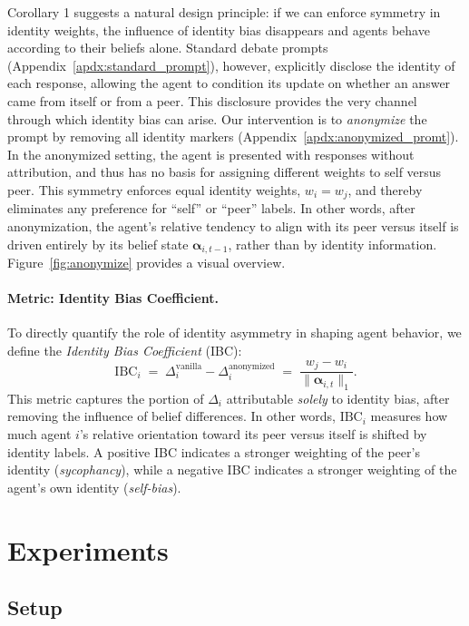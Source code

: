 \documentclass{article}
\begin{document}
Corollary 1 suggests a natural design principle: if we can enforce symmetry in identity weights, the influence of identity bias disappears and agents behave according to their beliefs alone. Standard debate prompts (Appendix~\ref{apdx:standard_prompt}), however, explicitly disclose the identity of each response, allowing the agent to condition its update on whether an answer came from itself or from a peer. 
This disclosure provides the very channel through which identity bias can arise. 
Our intervention is to \emph{anonymize} the prompt by removing all identity markers (Appendix~\ref{apdx:anonymized_promt}). 
In the anonymized setting, the agent is presented with responses without attribution, and thus has no basis for assigning different weights to self versus peer. 
This symmetry enforces equal identity weights, $w_i = w_j$, and thereby eliminates any  preference for ``self'' or ``peer'' labels.
In other words, after anonymization, the agent’s relative tendency to align with its peer versus itself is driven entirely by its belief state \(\boldsymbol\alpha_{i,t-1}\), rather than by identity information. 
Figure~\ref{fig:anonymize} provides a visual overview.


\paragraph{Metric: Identity Bias Coefficient.} To directly quantify the role of identity asymmetry in shaping agent behavior, we define the \emph{Identity Bias Coefficient} (IBC): 
\begin{equation}
    \text{IBC}_{i} \;=\; \Delta_{i}^\text{vanilla} - {\Delta}_{i}^\text{anonymized}
    \;=\; \frac{w_j - w_i}{\|\boldsymbol{\alpha}_{i,t}\|_1}.
\end{equation}
This metric captures the portion of $\Delta_i$ attributable \emph{solely} to identity bias, after removing the influence of belief differences. 
In other words, $\text{IBC}_i$ measures how much agent $i$’s relative orientation toward its peer versus itself is shifted by identity labels. 
A positive IBC indicates a stronger weighting of the peer’s identity (\emph{sycophancy}), while a negative IBC indicates a stronger weighting of the agent’s own identity (\emph{self-bias}).



\section{Experiments}

\subsection{Setup}
\label{sec:setup}
\end{document}
